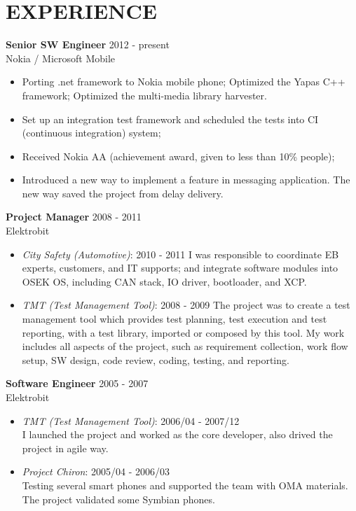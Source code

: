 
\section{EXPERIENCE}
\textbf{Senior SW Engineer} \hfill 2012 - present\\
        Nokia / Microsoft Mobile
        \begin{itemize}  \itemsep -2pt %
        \item Porting .net framework to Nokia mobile phone;
        Optimized the Yapas C++ framework;
        Optimized the multi-media library harvester.
        \item Set up an integration test framework
        and scheduled the tests into CI (continuous integration) system;
        \item Received Nokia AA (achievement award, given to less than 10\% people);
        \item Introduced a new way to implement a feature in messaging application.
        The new way saved the project from delay delivery.
        \end{itemize}

\textbf{Project Manager} \hfill 2008 - 2011\\
        Elektrobit
        \begin{itemize}  \itemsep -2pt %
            \item {\em City Safety (Automotive)}: 2010 - 2011
                    I was responsible to coordinate EB experts, customers, and IT supports;
                    and integrate software modules into OSEK OS,
                    including CAN stack, IO driver, bootloader, and XCP.
            \item {\em TMT (Test Management Tool)}: 2008 - 2009
                    The project was to create a test management tool
                    which provides test planning, test execution and test reporting,
                    with a test library, imported or composed by this tool.
                    My work includes all aspects of the project,
                    such as requirement collection, work flow setup, SW design, code review, coding, testing, and reporting.
        \end{itemize}
 
\textbf{Software Engineer} \hfill 2005 - 2007 \\
        Elektrobit
        \begin{itemize}  \itemsep -2pt %
            \item {\em TMT (Test Management Tool)}: 2006/04 - 2007/12 \\ 
            I launched the project and worked as the core developer, also drived 
            the project in agile way.
            \item {\em Project Chiron}: 2005/04 - 2006/03 \\
                Testing several smart phones and supported the team with OMA materials.
                The project validated some Symbian phones.
        \end{itemize}
 
